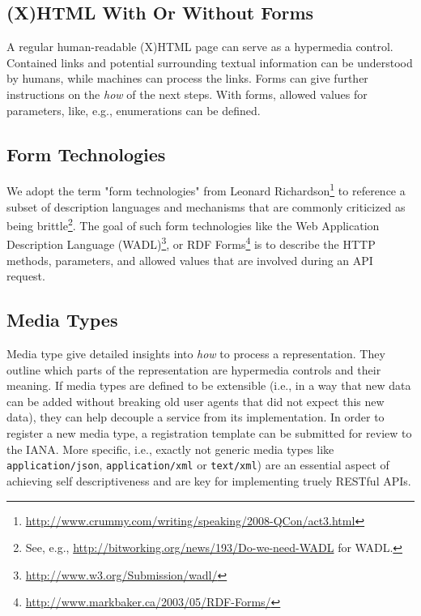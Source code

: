 \documentclass{acm_proc_article-sp}
\begin{document}
\subsection{(X)HTML With Or Without Forms}\label{sec:xhtml}
A regular human-readable (X)HTML page can serve as a hypermedia control. Contained links and potential surrounding textual information can be understood by humans, while machines can process the links. Forms can give further instructions on the \textit{how} of the next steps. With forms, allowed values for parameters, like, e.g., enumerations can be defined.

\subsection{Form Technologies}\label{sec:formtechs}
We adopt the term "form technologies" from Leonard Richardson\footnote{\url{http://www.crummy.com/writing/speaking/2008-QCon/act3.html}} to reference a subset of description languages and mechanisms that are commonly criticized as being brittle\footnote{See, e.g., \url{http://bitworking.org/news/193/Do-we-need-WADL} for WADL.}. The goal of such form technologies like the Web Application Description Language (WADL)\footnote{\url{http://www.w3.org/Submission/wadl/}}, or RDF Forms\footnote{\url{http://www.markbaker.ca/2003/05/RDF-Forms/}} is to describe the HTTP methods, parameters, and allowed values that are involved during an API request.

\subsection{Media Types}\label{sec:mediatypes}
Media type give detailed insights into \textit{how} to process a representation. They outline which parts of the representation are hypermedia controls and their meaning. If media types are defined to be extensible (i.e., in a way that new data can be added without breaking old user agents that did not expect this new data), they can help decouple a service from its implementation. In order to register a new media type, a registration template can be submitted for review to the IANA. More specific, i.e., exactly not generic media types like \texttt{application/json}, \texttt{application/xml} or \texttt{text/xml}) are an essential aspect of achieving self descriptiveness and are key for implementing truely RESTful APIs.
\end{document}
